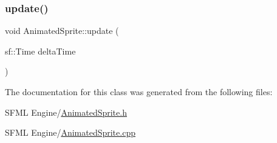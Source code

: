 \mbox{\label{class_animated_sprite_a17a41ff812631a9d8947d272933d6696}} 
\subsubsection{\texorpdfstring{update()}{update()}}
{\footnotesize\ttfamily void Animated\+Sprite\+::update (\begin{DoxyParamCaption}\item[{sf\+::\+Time}]{delta\+Time }\end{DoxyParamCaption})}



The documentation for this class was generated from the following files\+:\begin{DoxyCompactItemize}
\item 
S\+F\+M\+L Engine/\hyperlink{_animated_sprite_8h}{Animated\+Sprite.\+h}\item 
S\+F\+M\+L Engine/\hyperlink{_animated_sprite_8cpp}{Animated\+Sprite.\+cpp}\end{DoxyCompactItemize}
